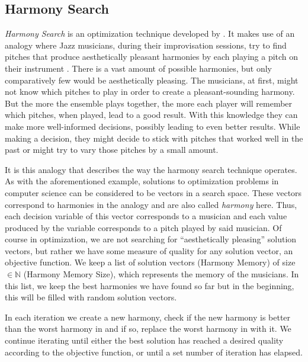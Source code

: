 \subsection{Harmony Search}
\label{subsec:04:hs}


\emph{Harmony Search} \cite{geem_optimal_2000,geem_state---art_2010} is an optimization technique developed by .
It makes use of an analogy where Jazz musicians, during their improvisation sessions, try to find pitches that produce aesthetically pleasant harmonies by each playing a pitch on their instrument \cite{geem_introduction_2022}.
There is a vast amount of possible harmonies, but only comparatively few would be aesthetically pleasing.
The musicians, at first, might not know which pitches to play in order to create a pleasant-sounding harmony.
But the more the ensemble plays together, the more each player will remember which pitches, when played, lead to a good result.
With this knowledge they can make more well-informed decisions, possibly leading to even better results.
While making a decision, they might decide to stick with pitches that worked well in the past or might try to vary those pitches by a small amount.

It is this analogy that describes the way the harmony search technique operates.
As with the aforementioned example, solutions to optimization problems in computer science can be considered to be vectors in a search space.
These vectors correspond to harmonies in the analogy and are also called \emph{harmony} here.
Thus, each decision variable of this vector corresponds to a musician and each value produced by the variable corresponds to a pitch played by said musician.
Of course in optimization, we are not searching for \enquote{aesthetically pleasing} solution vectors, but rather we have some measure of quality for any solution vector, an objective function.
We keep a list of solution vectors \hm{} (Harmony Memory) of size \hms{} $\in \mathbb{N}$ (Harmony Memory Size), which represents the memory of the musicians.
In this list, we keep the best harmonies we have found so far but in the beginning, this will be filled with random solution vectors.

In each iteration we create a new harmony, check if the new harmony is better than the worst harmony in \hm{} and if so, replace the worst harmony in \hm{} with it.
We continue iterating until either the best solution has reached a desired quality according to the objective function, or until a set number of iteration has elapsed.

